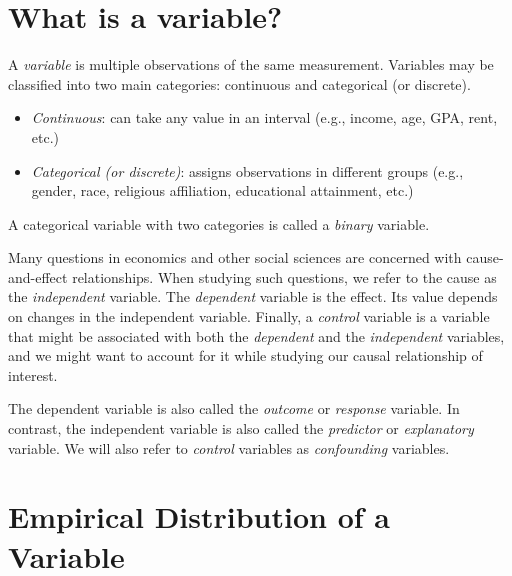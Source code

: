\documentclass{./../../Latex/handout}
\begin{document}
\thispagestyle{plain}

\vspace{-1cm}
\section{What is a variable?}

A \textit{variable} is multiple observations of the same measurement. Variables may be classified into two main categories: continuous and categorical (or discrete).
\begin{itemize}
\item \textit{Continuous}: can take any value in an interval (e.g., income, age, GPA, rent, etc.)
\item \textit{Categorical (or discrete)}: assigns observations in different groups  (e.g., gender, race, religious affiliation, educational attainment, etc.)
\end{itemize}
A categorical variable with two categories is called a \textit{binary} variable. 

Many questions in economics and other social sciences are concerned with cause-and-effect relationships. When studying such questions, we refer to the cause as the \textit{independent} variable. The \textit{dependent} variable is the effect. Its value depends on changes in the independent variable. Finally, a \textit{control} variable is a variable that might be associated with both the \textit{dependent} and the \textit{independent} variables, and we might want to account for it while studying our causal relationship of interest. 
\begin{center}
\end{center}

The dependent variable is also called the \textit{outcome} or \textit{response} variable. In contrast, the independent variable is also called the \textit{predictor} or \textit{explanatory} variable. We will also refer to \textit{control} variables as \textit{confounding} variables. 

\section{Empirical Distribution of a Variable}
\end{document}
